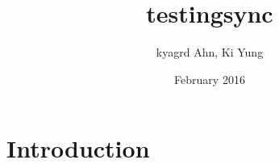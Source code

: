 \documentclass{article}
\title{testingsync}
\author{kyagrd Ahn, Ki Yung}
\date{February 2016}
\begin{document}
\maketitle

\section{Introduction}
\end{document}
